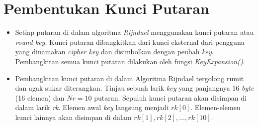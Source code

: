 \documentclass{article}
\begin{document}

\section*{Pembentukan Kunci Putaran}

\begin{itemize}
    \item Setiap putaran di dalam algoritma \textit{Rijndael} menggunakan kunci putaran atau \textit{round key}. Kunci putaran dibangkitkan dari kunci eksternal dari pengguna yang dinamakan \textit{cipher key} dan disimbolkan dengan peubah \textit{key}. Pembangkitan semua kunci putaran dilakukan oleh fungsi \textit{KeyExpansion()}.
    \item Pembangkitan kunci putaran di dalam Algoritma Rijndael tergolong rumit dan agak sukar diterangkan. Tinjau sebuah larik \textit{key} yang panjangnya 16 \textit{byte} (16 elemen) dan $Nr = 10$ putaran. Sepuluh kunci putaran akan disimpan di dalam larik \textit{rk}. Elemen awal \textit{key} langsung menjadi $rk[0]$. Elemen-elemen kunci lainnya akan disimpan di dalam $rk[1], rk[2], \dots, rk[10]$.
\end{itemize}
\end{document}

